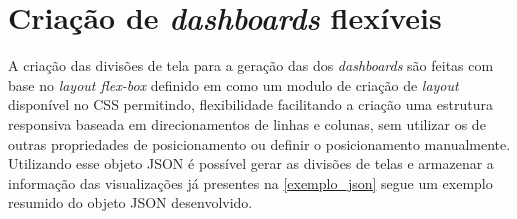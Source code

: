 \documentclass[
	12pt,				%
	openright,			%
	oneside,			%
	a4paper,			%
	english,			%
	brazil				%
	]{abntex2}
\begin{document}
\chapter{Criação de \textit{dashboards} flexíveis} 
\label{ch:dashboardsflexíveis}
A criação das divisões de tela para a geração das dos \textit{dashboards} são feitas com base no \textit{layout flex-box} definido em \cite{w3c}
como um modulo de criação de \textit{layout} disponível no CSS permitindo, flexibilidade facilitando a criação uma estrutura responsiva baseada em direcionamentos de linhas e colunas, sem utilizar os de outras propriedades de posicionamento ou definir o posicionamento manualmente.
Utilizando esse objeto JSON é possível gerar as divisões de telas e armazenar a informação das visualizações já presentes na \autoref{exemplo_json} segue um exemplo resumido do objeto JSON desenvolvido.
\end{document}
